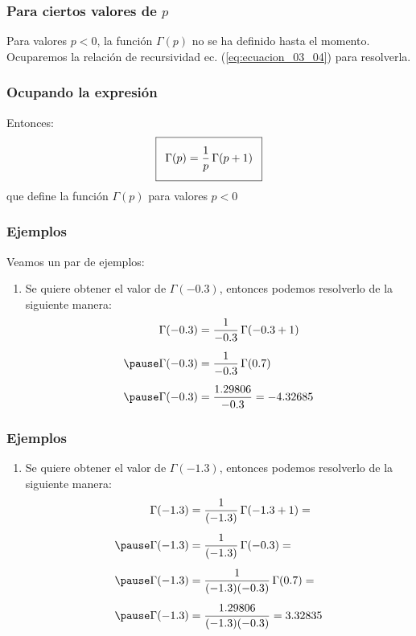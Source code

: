 \documentclass[12pt]{beamer}
\begin{document}
\begin{frame}
\frametitle{Para ciertos valores de $p$}
Para valores $p < 0$, la función $\Gamma (p)$ no se ha definido hasta el momento.
\\
\bigskip
\pause
Ocuparemos la relación de recursividad ec. (\ref{eq:ecuacion_03_04}) para resolverla.
\end{frame}
\begin{frame}
\frametitle{Ocupando la expresión}
Entonces:
\pause
\begin{align}\addtolength{\fboxsep}{5pt}\boxed{
\Gamma (p) = \dfrac{1}{p} \, \Gamma (p + 1)}
\label{eq:ecuacion_04_01}
\end{align}
que define la función $\Gamma (p)$ para valores $p < 0$
\end{frame}
\begin{frame}
\frametitle{Ejemplos}
Veamos un par de ejemplos:
\pause
{}
\begin{enumerate}
\item  Se quiere obtener el valor de $\Gamma (-0.3)$, entonces podemos resolverlo de la siguiente manera:
\begin{eqnarray*}
\begin{aligned}
\Gamma (-0.3) &= \dfrac{1}{-0.3} \, \Gamma (-0.3 + 1) \\[0.5em] \pause
\Gamma (-0.3) &= \dfrac{1}{-0.3} \, \Gamma (0.7) \\[0.5em] \pause
\Gamma (-0.3) &= \dfrac{1.29806}{-0.3} = -4.32685
\end{aligned}
\end{eqnarray*}
\seti
\end{enumerate}
\end{frame}
\begin{frame}
\frametitle{Ejemplos}
\begin{enumerate}
\conti
\item  Se quiere obtener el valor de $\Gamma (-1.3)$, entonces podemos resolverlo de la siguiente manera:
\begin{eqnarray*}
\begin{aligned}
\Gamma (-1.3) &= \dfrac{1}{(-1.3)} \, \Gamma (-1.3 + 1) = \\[0.5em] \pause
\Gamma (-1.3) &= \dfrac{1}{(-1.3)} \, \Gamma (-0.3) = \\[0.5em] \pause
\Gamma (-1.3) &= \dfrac{1}{(-1.3)(-0.3)} \, \Gamma (0.7) = \\[0.5em] \pause
\Gamma (-1.3) &= \dfrac{1.29806}{(-1.3)(-0.3)} = 3.32835
\end{aligned}
\end{eqnarray*}
\end{enumerate}
\end{frame}
\end{document}

